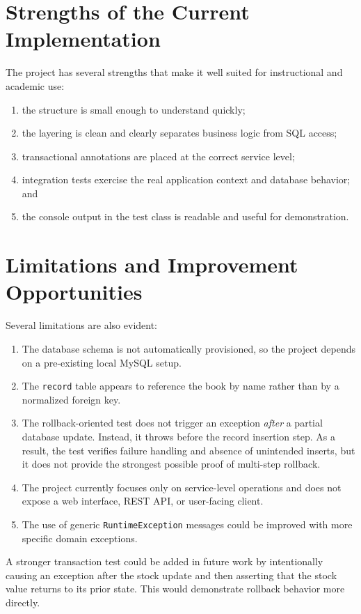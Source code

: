 \documentclass[12pt,a4paper]{report}
\begin{document}
\section{Strengths of the Current Implementation}
The project has several strengths that make it well suited for instructional and academic use:
\begin{enumerate}
    \item the structure is small enough to understand quickly;
    \item the layering is clean and clearly separates business logic from SQL access;
    \item transactional annotations are placed at the correct service level;
    \item integration tests exercise the real application context and database behavior; and
    \item the console output in the test class is readable and useful for demonstration.
\end{enumerate}

\section{Limitations and Improvement Opportunities}
Several limitations are also evident:
\begin{enumerate}
    \item The database schema is not automatically provisioned, so the project depends on a pre-existing local MySQL setup.
    \item The \texttt{record} table appears to reference the book by name rather than by a normalized foreign key.
    \item The rollback-oriented test does not trigger an exception \emph{after} a partial database update. Instead, it throws before the record insertion step. As a result, the test verifies failure handling and absence of unintended inserts, but it does not provide the strongest possible proof of multi-step rollback.
    \item The project currently focuses only on service-level operations and does not expose a web interface, REST API, or user-facing client.
    \item The use of generic \texttt{RuntimeException} messages could be improved with more specific domain exceptions.
\end{enumerate}

A stronger transaction test could be added in future work by intentionally causing an exception after the stock update and then asserting that the stock value returns to its prior state. This would demonstrate rollback behavior more directly.
\end{document}
